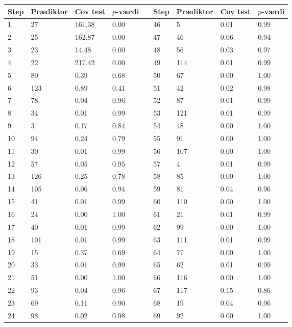 \begin{small}
\begin{table}[ht] 
\centering 
\begin{tabular}{lllllllll}
\toprule
Step & Prædiktor & Cov test & \(p\)-værdi && Step & Prædiktor & Cov test & \(p\)-værdi \\
\midrule
  1 & 27 & 161.38 & 0.00 & & 46 & 5 & 0.01 & 0.99 \\ 
  2 & 25 & 162.87 & 0.00 & & 47 & 46 & 0.06 & 0.94 \\ 
  3 & 23 & 14.48 & 0.00  & & 48 & 56 & 0.03 & 0.97 \\ 
  4 & 22 & 217.42 & 0.00 & & 49 & 114 & 0.01 & 0.99 \\  
   5 & 80 & 0.39 & 0.68 & & 50 & 67 & 0.00 & 1.00 \\ 
  6 & 123 & 0.89 & 0.41 & & 51 & 42 & 0.02 & 0.98 \\ 
  7 & 78 & 0.04 & 0.96 & & 52 & 87 & 0.01 & 0.99 \\
  8 & 34 & 0.01 & 0.99 & & 53 & 121 & 0.01 & 0.99 \\ 
  9 & 3 & 0.17 & 0.84 & & 54 & 48 & 0.00 & 1.00 \\
  10 & 94 & 0.24 & 0.79 & & 55 & 91 & 0.00 & 1.00 \\ 
  11 & 30 & 0.01 & 0.99 & & 56 & 107 & 0.00 & 1.00 \\  
  12 & 57 & 0.05 & 0.95 & & 57 & 4 & 0.01 & 0.99 \\ 
  13 & 126 & 0.25 & 0.78 & & 58 & 85 & 0.00 & 1.00 \\ 
  14 & 105 & 0.06 & 0.94  & & 59 & 81 & 0.04 & 0.96 \\ 
  15 & 41 & 0.01 & 0.99 & & 60 & 110 & 0.00 & 1.00 \\ 
  16 & 24 & 0.00 & 1.00 & & 61 & 21 & 0.01 & 0.99 \\  
  17 & 40 & 0.01 & 0.99 & & 62 & 99 & 0.00 & 1.00 \\ 
  18 & 101 & 0.01 & 0.99 & & 63 & 111 & 0.01 & 0.99 \\ 
  19 & 15 & 0.37 & 0.69 & & 64 & 77 & 0.00 & 1.00 \\ 
  20 & 33 & 0.01 & 0.99 & & 65 & 62 & 0.01 & 0.99 \\ 
  21 & 51 & 0.00 & 1.00 & & 66 & 116 & 0.00 & 1.00 \\ 
  22 & 93 & 0.04 & 0.96 & & 67 & 117 & 0.15 & 0.86 \\  
  23 & 69 & 0.11 & 0.90 & & 68 & 19 & 0.04 & 0.96 \\
  24 & 98 & 0.02 & 0.98 & & 69 & 92 & 0.00 & 1.00 \\  

\end{tabular}
\end{table}
\end{small}
